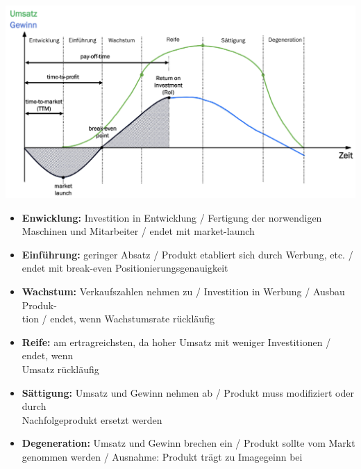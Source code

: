 \begin{scriptsize}
    \begin{center}
        \includegraphics[width = 0.9\linewidth]{src/images/MAEIP_Produktlebenszyklus}
    \end{center}
    \begin{itemize}
        \item \textbf{Enwicklung:} Investition in Entwicklung / Fertigung der norwendigen Maschinen und Mitarbeiter / endet mit market-launch
        \item \textbf{Einführung:} geringer Absatz / Produkt etabliert sich durch Werbung, etc. / endet mit break-even Positionierungsgenauigkeit
        \item \textbf{Wachstum:} Verkaufszahlen nehmen zu / Investition in Werbung / Ausbau Produk-\\tion / endet, wenn Wachstumsrate rückläufig
        \item \textbf{Reife:} am ertragreichsten, da hoher Umsatz mit weniger Investitionen / endet, wenn \\Umsatz rückläufig
        \item \textbf{Sättigung:} Umsatz und Gewinn nehmen ab / Produkt muss modifiziert oder durch \\Nachfolgeprodukt ersetzt werden
        \item \textbf{Degeneration:} Umsatz und Gewinn brechen ein / Produkt sollte vom Markt \\genommen werden / Ausnahme: Produkt trägt zu Imagegeinn bei
    \end{itemize}
\end{scriptsize}